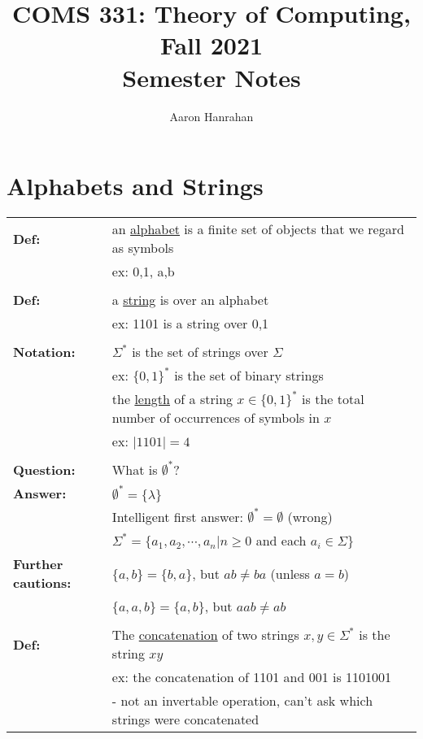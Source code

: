 \documentclass[11pt]{article}
\begin{document}
\title{COMS 331: Theory of Computing, Fall 2021\\
Semester Notes\\}
\author{Aaron Hanrahan}
\date{}
\maketitle

\section{Alphabets and Strings}

\begin{tabular}{ll}
{\bf Def:} & an \underline{alphabet} is a finite set of objects that we regard as symbols \\
& ex: {0,1}, {a,b} \\
\\
{\bf Def:} & a \underline{string} is over an alphabet \\
& ex: 1101 is a string over {0,1} \\
\\
{\bf Notation:} & $\Sigma^*$ is the set of strings over $\Sigma$ \\
& ex: $\{0,1\}^*$ is the set of binary strings \\
& the \underline{length} of a string $x \in \{0,1\}^*$ is the total number of occurrences of symbols in $x$\\
& ex: $|1101|=4$ \\
\\
{\bf Question:} & What is $\emptyset^*$? \\
{\bf Answer:} & $\emptyset^*=\{\lambda\}$ \\
& Intelligent first answer: $\emptyset^* = \emptyset$ (wrong)\\
& $\Sigma^*=\{a_1,a_2,\cdots,a_n|n \geqslant 0$ and each $a_i\in\Sigma\}$\\
{\bf Further cautions:} & $\{a,b\}=\{b,a\}$, but $ab \neq ba$ (unless $a=b$) \\
& $\{a,a,b\}=\{a,b\}$, but $aab\neq ab$ \\
\\
{\bf Def:} & The \underline{concatenation} of two strings $x,y\in\Sigma^*$ is the string $xy$ \\
& ex: the concatenation of 1101 and 001 is 1101001 \\
& - not an invertable operation, can't ask which strings were concatenated \\
\end{tabular}
\end{document}

